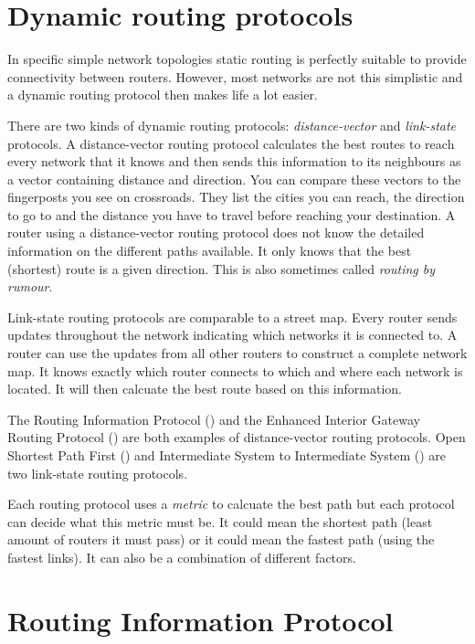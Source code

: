 \section{Dynamic routing protocols}
\label{sec:routing-dynamic}

In specific simple network topologies static routing is perfectly suitable to provide connectivity between routers.
However, most networks are not this simplistic and a dynamic routing protocol then makes life a lot easier.

There are two kinds of dynamic routing protocols: \emph{distance-vector} and \emph{link-state} protocols.
A distance-vector routing protocol calculates the best routes to reach every network that it knows and then sends this information to its neighbours as a vector containing distance and direction.
You can compare these vectors to the fingerposts you see on crossroads.
They list the cities you can reach, the direction to go to and the distance you have to travel before reaching your destination.
A router using a distance-vector routing protocol does not know the detailed information on the different paths available.
It only knows that the best (shortest) route is a given direction.
This is also sometimes called \emph{routing by rumour}.

Link-state routing protocols are comparable to a street map.
Every router sends updates throughout the network indicating which networks it is connected to.
A router can use the updates from all other routers to construct a complete network map.
It knows exactly which router connects to which and where each network is located.
It will then calcuate the best route based on this information.

The Routing Information Protocol () and the Enhanced Interior Gateway Routing Protocol () are both examples of distance-vector routing protocols.
Open Shortest Path First () and Intermediate System to Intermediate System () are two link-state routing protocols.

Each routing protocol uses a \emph{metric} to calcuate the best path but each protocol can decide what this metric must be.
It could mean the shortest path (least amount of routers it must pass) or it could mean the fastest path (using the fastest links).
It can also be a combination of different factors.

\section{Routing Information Protocol}
\label{sec:rip}

